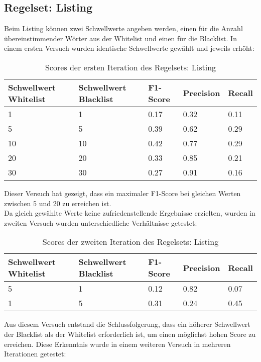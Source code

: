 \subsection{Regelset: Listing}
Beim Listing können zwei Schwellwerte angeben werden, einen für die Anzahl übereinstimmender Wörter aus der Whitelist und einen für die Blacklist.
In einem ersten Versuch wurden identische Schwellwerte gewählt und jeweils erhöht:\\
\begin{table}[H]
	\caption{Scores der ersten Iteration des Regelsets: Listing}
	\centering
\begin{tabular}{|l|l|l|l|l|}
	\hline
	Schwellwert Whitelist & Schwellwert Blacklist & F1-Score & Precision & Recall\\
	\hline
	1 & 1 & 0.17 & 0.32 & 0.11 \\
	5 & 5 & 0.39 & 0.62 & 0.29 \\
	10 & 10 & 0.42 & 0.77 & 0.29 \\
	20 & 20 & 0.33 & 0.85 & 0.21 \\
	30 & 30 & 0.27 & 0.91 & 0.16 \\
	\hline
\end{tabular}
\end{table}
Dieser Versuch hat gezeigt, dass ein maximaler F1-Score bei gleichen Werten zwischen 5 und 20 zu erreichen ist.\\
Da gleich gewählte Werte keine zufriedenstellende Ergebnisse erzielten, wurden in zweiten Versuch wurden unterschiedliche Verhältnisse getestet:\\
\begin{table}[H]
	\caption{Scores der zweiten Iteration des Regelsets: Listing}
	\centering
\begin{tabular}{|l|l|l|l|l|}
	\hline
	Schwellwert Whitelist & Schwellwert Blacklist & F1-Score & Precision & Recall\\
	\hline
	5 & 1 & 0.12 & 0.82 & 0.07 \\
	1 & 5 & 0.31 & 0.24 & 0.45 \\
	\hline
\end{tabular}
\end{table}
Aus diesem Versuch entstand die Schlussfolgerung, dass ein höherer Schwellwert der Blacklist als der Whitelist erforderlich ist, um einen möglichst hohen Score zu erreichen.
Diese Erkenntnis wurde in einem weiteren Versuch in mehreren Iterationen getestet:\\
